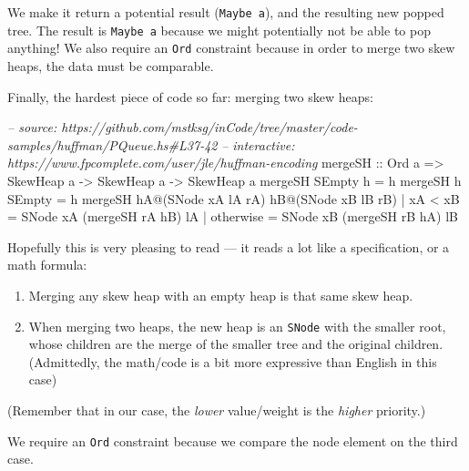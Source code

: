 \documentclass[]{article}
\newenvironment{Shaded}{}{}
\newcommand{\DataTypeTok}[1]{\textcolor[rgb]{0.56,0.13,0.00}{{#1}}}
\newcommand{\CommentTok}[1]{\textcolor[rgb]{0.38,0.63,0.69}{\textit{{#1}}}}
\newcommand{\OtherTok}[1]{\textcolor[rgb]{0.00,0.44,0.13}{{#1}}}
\newcommand{\FunctionTok}[1]{\textcolor[rgb]{0.02,0.16,0.49}{{#1}}}
\newcommand{\NormalTok}[1]{{#1}}
\begin{document}
We make it return a potential result (\texttt{Maybe\ a}), and the
resulting new popped tree. The result is \texttt{Maybe\ a} because we
might potentially not be able to pop anything! We also require an
\texttt{Ord} constraint because in order to merge two skew heaps, the
data must be comparable.

Finally, the hardest piece of code so far: merging two skew heaps:

\begin{Shaded}
\begin{Highlighting}[]
\CommentTok{-- source: https://github.com/mstksg/inCode/tree/master/code-samples/huffman/PQueue.hs#L37-42}
\CommentTok{-- interactive: https://www.fpcomplete.com/user/jle/huffman-encoding}
\OtherTok{mergeSH ::} \DataTypeTok{Ord} \NormalTok{a }\OtherTok{=>} \DataTypeTok{SkewHeap} \NormalTok{a }\OtherTok{->} \DataTypeTok{SkewHeap} \NormalTok{a }\OtherTok{->} \DataTypeTok{SkewHeap} \NormalTok{a}
\NormalTok{mergeSH }\DataTypeTok{SEmpty} \NormalTok{h }\FunctionTok{=} \NormalTok{h}
\NormalTok{mergeSH h }\DataTypeTok{SEmpty} \FunctionTok{=} \NormalTok{h}
\NormalTok{mergeSH hA}\FunctionTok{@}\NormalTok{(}\DataTypeTok{SNode} \NormalTok{xA lA rA) hB}\FunctionTok{@}\NormalTok{(}\DataTypeTok{SNode} \NormalTok{xB lB rB)}
    \FunctionTok{|} \NormalTok{xA }\FunctionTok{<} \NormalTok{xB    }\FunctionTok{=} \DataTypeTok{SNode} \NormalTok{xA (mergeSH rA hB) lA}
    \FunctionTok{|} \NormalTok{otherwise  }\FunctionTok{=} \DataTypeTok{SNode} \NormalTok{xB (mergeSH rB hA) lB}
\end{Highlighting}
\end{Shaded}

Hopefully this is very pleasing to read --- it reads a lot like a
specification, or a math formula:

\begin{enumerate}
\def\labelenumi{\arabic{enumi}.}
\tightlist
\item
  Merging any skew heap with an empty heap is that same skew heap.
\item
  When merging two heaps, the new heap is an \texttt{SNode} with the
  smaller root, whose children are the merge of the smaller tree and the
  original children. (Admittedly, the math/code is a bit more expressive
  than English in this case)
\end{enumerate}

(Remember that in our case, the \emph{lower} value/weight is the
\emph{higher} priority.)

We require an \texttt{Ord} constraint because we compare the node
element on the third case.
\end{document}
